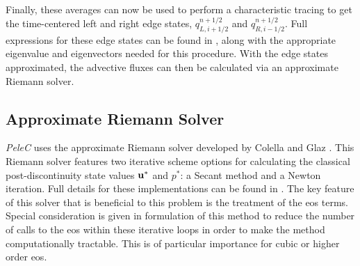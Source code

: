 Finally, these averages can now be used to perform a characteristic tracing to get the time-centered left and right edge states, $q_{L, i+1/2}^{n+1/2}$ and $q_{R, i-1/2}^{n+1/2}$. Full expressions for these edge states can be found in \cite{}, along with the appropriate eigenvalue and eigenvectors needed for this procedure. With the edge states approximated, the advective fluxes can then be calculated via an approximate Riemann solver.


\subsection{Approximate Riemann Solver}
\textit{PeleC} uses the approximate Riemann solver developed by Colella and Glaz \cite{COLELLA1985264}. This Riemann solver features two iterative scheme options for calculating the classical post-discontinuity state values $\vb{u}^*$ and $p^*$: a Secant method and a Newton iteration. Full details for these implementations can be found in \cite{COLELLA1985264}. The key feature of this solver that is beneficial to this problem is the treatment of the \gls{eos} terms. Special consideration is given in formulation of this method to reduce the number of calls to the \gls{eos} within these iterative loops in order to make the method computationally tractable. This is of particular importance for cubic or higher order \gls{eos}. 


